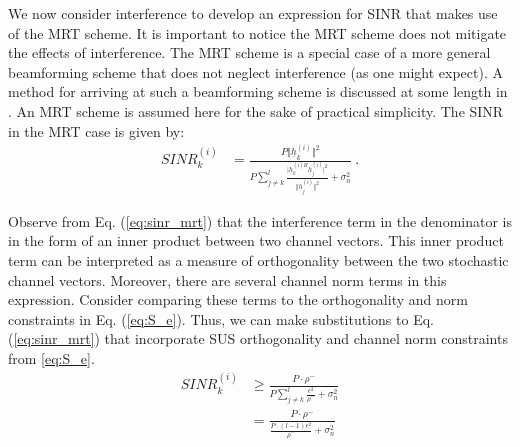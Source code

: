 
 We now consider interference to develop an expression for SINR that makes use of the MRT scheme. It is important to notice the MRT scheme does not mitigate the effects of interference. The MRT scheme is a special case of a more general beamforming scheme that does not neglect interference (as one might expect). A method for arriving at such a beamforming scheme is discussed at some length in \cite{Bjornson2014}. An MRT scheme is assumed here for the sake of practical simplicity. The SINR in the MRT case is given by:
  \begin{equation}
     \begin{aligned}\label{eq:sinr_mrt}
            SINR_k^{(i)} &=  \frac{P\Vert \underline{h}_k^{(i)}\Vert^2}{P\sum_{j \neq k}^l  \frac{\vert\underline{h}_k^{(i)H}\underline{h}_j^{(i)}\vert^2}{\Vert \underline{h}_j^{(i)}\Vert^2}  + \sigma_n^2} \ .
     \end{aligned}
 \end{equation}
 
 Observe from Eq. (\ref{eq:sinr_mrt}) that the interference term in the denominator is in the form of an inner product between two channel vectors. This inner product term can be interpreted as a measure of orthogonality between the two stochastic channel vectors. Moreover, there are several channel norm terms in this expression. Consider comparing these terms to the orthogonality and norm constraints in Eq. (\ref{eq:S_e}). Thus, we can make substitutions to Eq. (\ref{eq:sinr_mrt}) that incorporate SUS orthogonality and channel norm constraints from \ref{eq:S_e}.
\begin{equation}\label{eq:sinr_epsilon}
    \begin{aligned}
        SINR_k^{(i)} &\geq  \frac{P \cdot \rho^-}{P\sum_{j \neq k}^l  \frac{\epsilon^2}{\rho^-}  + \sigma_n^2} \\
        &=\frac{P \cdot \rho^-}{\frac{P\cdot(l-1)\epsilon^2}{\rho^-}  + \sigma_n^2}
    \end{aligned}
\end{equation}

